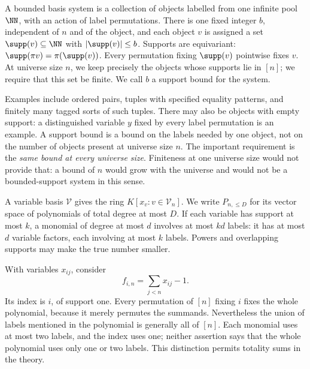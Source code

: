 \begin{definition}\label{tx:def:basis}
A bounded basis system is a collection of objects labelled from one
infinite pool $\NN$, with an action of label permutations. There is
one fixed integer $b$, independent of $n$ and of the object, and each
object $v$ is assigned a set $\supp(v)\subseteq\NN$ with
$|\supp(v)|\le b$. Supports are equivariant:
$\supp(\pi v)=\pi(\supp(v))$. Every permutation fixing
$\supp(v)$ pointwise fixes $v$. At universe size $n$, we keep precisely the
objects whose supports lie in $[n]$; we require that this set be finite.
We call $b$ a support bound for the system.
\end{definition}

Examples include ordered pairs, tuples with specified equality patterns,
and finitely many tagged sorts of such tuples. There may also be objects
with empty support: a distinguished variable $y$ fixed by every label
permutation is an example. A support bound is a bound on the labels
needed by one object, not on the number of objects present at universe size $n$.
The important requirement is the \emph{same bound at every universe size}.
Finiteness at one universe size would not provide that: a bound of $n$ would
grow with the universe and would not be a bounded-support system in
this sense.

A variable basis $\mathcal V$ gives the ring
$K[x_v:v\in\mathcal V_n]$. We write $P_{n,\le D}$ for its vector
space of polynomials of total degree at most $D$. If each variable has support at most $k$,
a monomial of degree at most $d$ involves at most $kd$ labels: it has
at most $d$ variable factors, each involving at most $k$ labels. Powers
and overlapping supports may make the true number smaller.

\begin{example}\label{tx:eg:row-support}
With variables $x_{ij}$, consider
\[
                         f_{i,n}=\sum_{j<n}x_{ij}-1.
\]
Its index is $i$, of support one. Every permutation of $[n]$ fixing $i$ fixes the
whole polynomial, because it merely permutes the summands. Nevertheless
the union of labels mentioned in the polynomial is generally all of
$[n]$. Each monomial uses at most two labels, and the index uses one;
neither assertion says that the whole polynomial uses only one or two
labels. This distinction permits totality sums in the theory.
\end{example}

